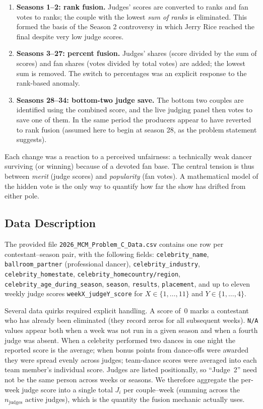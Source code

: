 \documentclass{article}
\begin{document}
\begin{enumerate}
\item \textbf{Seasons 1--2: rank fusion.} Judges' scores are converted to ranks and fan
votes to ranks; the couple with the lowest \emph{sum of ranks} is eliminated. This formed
the basis of the Season 2 controversy in which Jerry Rice reached the final despite very
low judge scores.
\item \textbf{Seasons 3--27: percent fusion.} Judges' shares (score divided by the sum of
scores) and fan shares (votes divided by total votes) are added; the lowest sum is
removed. The switch to percentages was an explicit response to the rank-based anomaly.
\item \textbf{Seasons 28--34: bottom-two judge save.} The bottom two couples are identified
using the combined score, and the live judging panel then votes to save one of them. In
the same period the producers appear to have reverted to rank fusion (assumed here to begin
at season 28, as the problem statement suggests).
\end{enumerate}

Each change was a reaction to a perceived unfairness: a technically weak dancer surviving
(or winning) because of a devoted fan base. The central tension is thus between
\emph{merit} (judge scores) and \emph{popularity} (fan votes). A mathematical model of the
hidden vote is the only way to quantify how far the show has drifted from either pole.

\subsection{Data Description}

The provided file \texttt{2026\_MCM\_Problem\_C\_Data.csv} contains one row per
contestant--season pair, with the following fields: \texttt{celebrity\_name},
\texttt{ballroom\_partner} (professional dancer), \texttt{celebrity\_industry},
\texttt{celebrity\_homestate}, \texttt{celebrity\_homecountry/region},
\texttt{celebrity\_age\_during\_season}, \texttt{season}, \texttt{results},
\texttt{placement}, and up to eleven weekly judge scores \texttt{weekX\_judgeY\_score}
for $X\in\{1,\dots,11\}$ and $Y\in\{1,\dots,4\}$.

Several data quirks required explicit handling. A score of~$0$ marks a contestant who has
already been eliminated (they record zeros for all subsequent weeks). \texttt{N/A} values
appear both when a week was not run in a given season and when a fourth judge was absent.
When a celebrity performed two dances in one night the reported score is the average; when
bonus points from dance-offs were awarded they were spread evenly across judges; team-dance
scores were averaged into each team member's individual score. Judges are listed positionally,
so ``Judge~2'' need not be the same person across weeks or seasons. We therefore aggregate
the per-week judge score into a single total $J_{i}$ per couple--week (summing across the
$n_{\text{judges}}$ active judges), which is the quantity the fusion mechanic actually uses.
\end{document}
